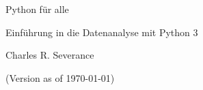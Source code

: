\begin{titlepage}
\begin{center}
\vspace*{30mm}

\sffamily
\LARGE
Python für alle

\large
Einführung in die Datenanalyse mit Python 3

\vspace{15mm}

\large
Charles R. Severance

\vspace{10cm}

\normalsize
(Version as of \today)

\end{center}
\end{titlepage}

\normalsize
\normalfont
